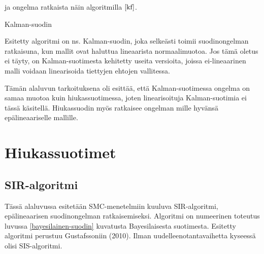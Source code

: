\documentclass[
  12pt,
  a4paper, twoside]{book}
\begin{document}
ja ongelma ratkaista näin algoritmilla \(\ref{kf}\).

\begin{algorithm}[H]
\label{kf}
\DontPrintSemicolon
\SetAlgoShortEnd
{}
\caption{Kalman-suodin}
\end{algorithm}

Esitetty algoritmi on ns. Kalman-suodin, joka selkeästi toimii suodinongelman ratkaisuna, kun mallit ovat haluttua lineaarista normaalimuotoa. Jos tämä oletus ei täyty, on Kalman-suotimesta kehitetty useita versioita, joissa ei-lineaarinen malli voidaan linearisoida tiettyjen ehtojen vallitessa.

Tämän alaluvun tarkoituksena oli esittää, että Kalman-suotimessa ongelma on samaa muotoa kuin hiukassuotimessa, joten linearisoituja Kalman-suotimia ei tässä käsitellä. Hiukassuodin myös ratkaisee ongelman mille hyvänsä epälineaariselle mallille.

\chapter{Hiukassuotimet} \label{hiukassuotimet}

\section{SIR-algoritmi}

Tässä alaluvussa esitetään SMC-menetelmiin kuuluva SIR-algoritmi, epälineaarisen suodinongelman ratkaisemiseksi. Algoritmi on numeerinen toteutus luvussa \ref{bayesilainen-suodin} kuvatusta Bayesilaisesta suotimesta. Esitetty algoritmi perustuu Gustafssoniin (2010). Ilman uudelleenotantavaihetta kyseessä olisi SIS-algoritmi.
\end{document}
